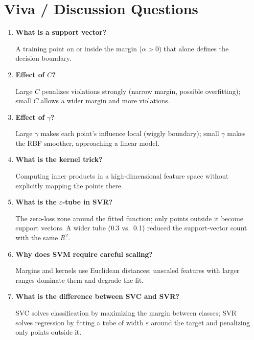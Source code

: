 \section{Viva / Discussion Questions}
\begin{enumerate}
  \item \textbf{What is a support vector?}\par\nobreak A training point on or inside the margin ($\alpha > 0$) that
  alone defines the decision boundary.
  \item \textbf{Effect of $C$?}\par\nobreak Large $C$ penalizes violations strongly (narrow margin, possible
  overfitting); small $C$ allows a wider margin and more violations.
  \item \textbf{Effect of $\gamma$?}\par\nobreak Large $\gamma$ makes each point's influence local (wiggly
  boundary); small $\gamma$ makes the RBF smoother, approaching a linear model.
  \item \textbf{What is the kernel trick?}\par\nobreak Computing inner products in a high-dimensional feature
  space without explicitly mapping the points there.
  \item \textbf{What is the $\varepsilon$-tube in SVR?}\par\nobreak The zero-loss zone around the fitted function;
  only points outside it become support vectors. A wider tube (0.3 vs.\ 0.1) reduced the
  support-vector count with the same $R^2$.
  \item \textbf{Why does SVM require careful scaling?}\par\nobreak Margins and kernels use Euclidean distances;
  unscaled features with larger ranges dominate them and degrade the fit.
\item \textbf{What is the difference between SVC and SVR?}\par\nobreak SVC solves classification by maximizing the margin between classes; SVR solves regression by fitting a tube of width $\varepsilon$ around the target and penalizing only points outside it.
\end{enumerate}

